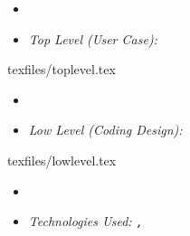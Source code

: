 \clearpage
\begin{itemize}
  \item[] 
  \item[] \textsl{\Large Top Level (User Case):} 
\end{itemize}
{texfiles/toplevel.tex}
\clearpage
\begin{itemize}
  \item[] 
  \item[] \textsl{\Large Low Level (Coding Design):}
\end{itemize}
{texfiles/lowlevel.tex}
\clearpage
\begin{itemize}
  \item[] 
  \item[] \textsl{\Large Technologies Used: \texttt{\normalsize\python, \selenium}}
\end{itemize}
 
